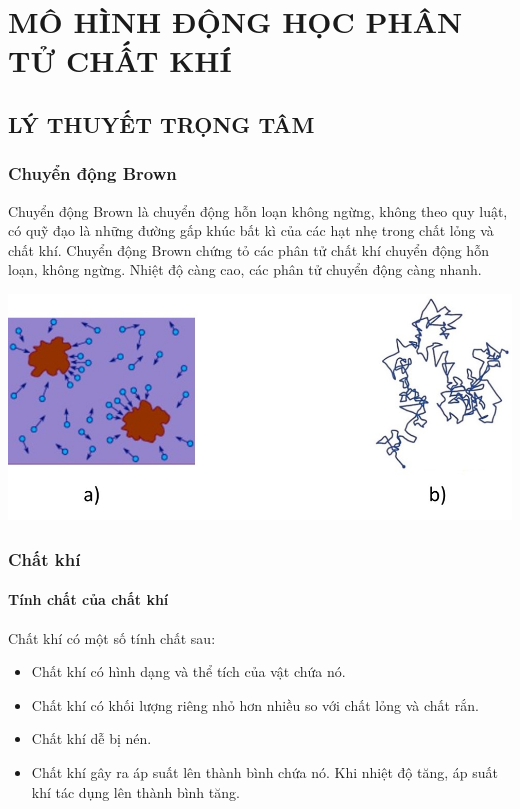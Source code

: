 \section{MÔ HÌNH ĐỘNG HỌC PHÂN TỬ CHẤT KHÍ}
\subsection{LÝ THUYẾT TRỌNG TÂM}
\subsubsection{Chuyển động Brown}
\begin{boxdn}
	Chuyển động Brown là chuyển động hỗn loạn không ngừng, không theo quy luật, có quỹ đạo là những đường gấp khúc bất kì của các hạt nhẹ trong chất lỏng và chất khí. Chuyển động Brown chứng tỏ các phân tử chất khí chuyển động hỗn loạn, không ngừng. Nhiệt độ càng cao, các phân tử chuyển động càng nhanh.
\end{boxdn}
\begin{center}
	\includegraphics[width=0.5\linewidth]{figs/VN12-Y24-PH-SYL-009-1}
\end{center}
\subsubsection{Chất khí}
\paragraph{Tính chất của chất khí}
\begin{boxdn}
	Chất khí có một số tính chất sau:
	\begin{itemize}
		\item Chất khí có hình dạng và thể tích của vật chứa nó.
		\item Chất khí có khối lượng riêng nhỏ hơn nhiều so với chất lỏng và chất rắn.
		\item Chất khí dễ bị nén.
		\item Chất khí gây ra áp suất lên thành bình chứa nó. Khi nhiệt độ tăng, áp suất khí tác dụng lên thành bình tăng.
	\end{itemize}
\end{boxdn}
